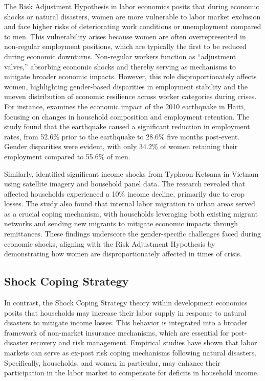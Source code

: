 \documentclass[a4paper,12pt]{article}
\begin{document}
The Risk Adjustment Hypothesis in labor economics posits that during economic shocks or natural disasters, women are more vulnerable to labor market exclusion and face higher risks of deteriorating work conditions or unemployment compared to men. This vulnerability arises because women are often overrepresented in non-regular employment positions, which are typically the first to be reduced during economic downturns. Non-regular workers function as ``adjustment valves,'' absorbing economic shocks and thereby serving as mechanisms to mitigate broader economic impacts. However, this role disproportionately affects women, highlighting gender-based disparities in employment stability and the uneven distribution of economic resilience across worker categories during crises. For instance, \citet{Kim2014ARetention} examines the economic impact of the 2010 earthquake in Haiti, focusing on changes in household composition and employment retention. The study found that the earthquake caused a significant reduction in employment rates, from 52.6\% prior to the earthquake to 28.6\% five months post-event. Gender disparities were evident, with only 34.2\% of women retaining their employment compared to 55.6\% of men.

Similarly, \citet{Groger2016InternalTyphoon} identified significant income shocks from Typhoon Ketsana in Vietnam using satellite imagery and household panel data. The research revealed that affected households experienced a 10\% income decline, primarily due to crop losses. The study also found that internal labor migration to urban areas served as a crucial coping mechanism, with households leveraging both existing migrant networks and sending new migrants to mitigate economic impacts through remittances. These findings underscore the gender-specific challenges faced during economic shocks, aligning with the Risk Adjustment Hypothesis by demonstrating how women are disproportionately affected in times of crisis.

\subsection{Shock Coping Strategy}


In contrast, the Shock Coping Strategy theory within development economics posits that households may increase their labor supply in response to natural disasters to mitigate income losses. This behavior is integrated into a broader framework of non-market insurance mechanisms, which are essential for post-disaster recovery and risk management. Empirical studies have shown that labor markets can serve as ex-post risk coping mechanisms following natural disasters. Specifically, households, and women in particular, may enhance their participation in the labor market to compensate for deficits in household income.
\end{document}
